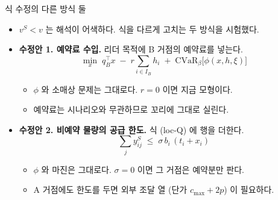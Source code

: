 \documentclass[aspectratio=169,11pt]{beamer}
\begin{document}
\begin{frame}{식 수정의 다른 방식 둘}
\begin{itemize}
  \item $v^{S} < v$ 는 해석이 어색하다. 식을 다르게 고치는 두 방식을 시험했다.
  \item \textbf{수정안 1. 예약료 수입.} 리더 목적에 B 거점의 예약료를 넣는다.
  \[
    \min_{x}\; q_B^{\top}x \;-\; r\sum_{i\in I_B} h_i \;+\; \mathrm{CVaR}_{\beta}\bigl[\phi(x,h,\xi)\bigr]
  \]
  \begin{itemize}
    \item $\phi$ 와 소매상 문제는 그대로다. $r = 0$ 이면 지금 모형이다.
    \item 예약료는 시나리오와 무관하므로 꼬리에 그대로 실린다.
  \end{itemize}
  \item \textbf{수정안 2. 비예약 물량의 공급 한도.} 식 (loc-Q) 에 행을 더한다.
  \[
    \sum_{j} y^{S}_{ij} \;\le\; \sigma\, b_i\,(t_i + x_i)
  \]
  \begin{itemize}
    \item $\phi$ 와 마진은 그대로다. $\sigma = 0$ 이면 그 거점은 예약분만 판다.
    \item A 거점에도 한도를 두면 외부 조달 열 (단가 $c_{\max} + 2p$) 이 필요하다.
  \end{itemize}
\end{itemize}
\end{frame}
\end{document}
